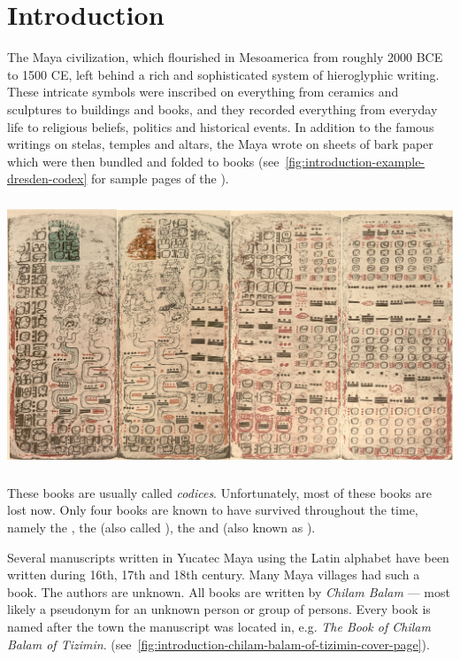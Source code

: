 \documentclass[../main.tex]{subfiles}
\begin{document}
\chapter{Introduction}
The Maya civilization, which flourished in Mesoamerica from roughly 2000 BCE to 1500 CE, 
left behind a rich and sophisticated system of hieroglyphic writing. 
These intricate symbols were inscribed on everything from ceramics and sculptures to buildings 
and books, and they recorded everything from everyday life to religious beliefs, politics and 
historical events.
In addition to the famous writings on stelas, temples and altars, the Maya wrote on sheets of 
bark paper which were then bundled and 
folded to books (see~\ref{fig:introduction-example-dresden-codex} for sample pages of the
\dresdencodex).
\begin{center}
    \includegraphics[height=8cm,keepaspectratio]{img/example-dresden-codex}
    \label{fig:introduction-example-dresden-codex}
\end{center}
These books are usually called \emph{codices}.
Unfortunately, most of these books are lost now.
Only four books are known to have survived throughout the time, 
namely the \dresdencodex, the \madridcodex (also called \troanocodex),
the \pariscodex and \mayamexicocodex(also known as \groliercodex).

Several manuscripts written in Yucatec Maya using the Latin alphabet have been written 
during 16th, 17th and 18th century.
Many Maya villages had such a book.
The authors are unknown.
All books are written by \emph{Chilam Balam} --- most likely a pseudonym for an unknown person or 
group of persons.
Every book is named after the town the manuscript was located in, e.g. 
\emph{The Book of Chilam Balam of Tizimin}.
(see~\ref{fig:introduction-chilam-balam-of-tizimin-cover-page}).
\end{document}
